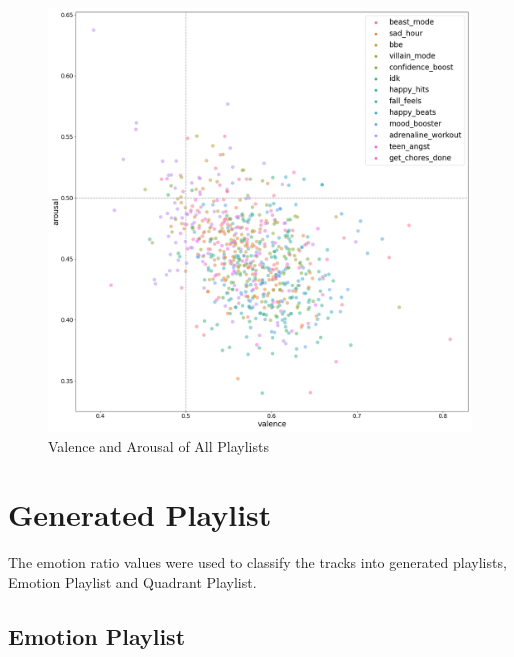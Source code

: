 \documentclass[11pt]{article}
\begin{document}
\begin{figure}[!ht]
  \includegraphics[scale=0.3]{../statics/plots/va_playlist_False.png}
  \centering
  \caption{Valence and Arousal of All Playlists}
  \label{fig:va_pl}
\end{figure}


\newpage
\section{Generated Playlist}

The emotion ratio values were used to classify the tracks into generated playlists, Emotion Playlist and Quadrant Playlist.

\subsection{Emotion Playlist}
\end{document}
